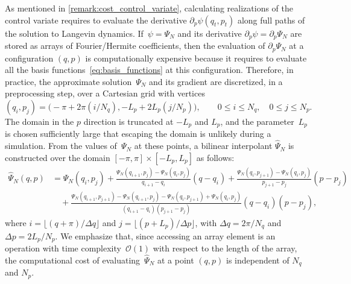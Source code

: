 \documentclass[11pt,a4paper]{article}
\begin{document}
As mentioned in \cref{remark:cost_control_variate},
calculating realizations of the control variate requires to evaluate the derivative $\partial_p \psi(q_t, p_t)$ along full paths of the solution to Langevin dynamics.
If~$\psi = \Psi_N$ and its derivative $\partial_p \psi = \partial_p \Psi_N$ are stored as arrays of Fourier/Hermite coefficients,
then the evaluation of $\partial_p \Psi_N$ at a configuration $(q, p)$ is computationally expensive
because it requires to evaluate all the basis functions~\eqref{eq:basis_functions} at this configuration.
Therefore, in practice, the approximate solution~$\Psi_N$ and its gradient are discretized, in a preprocessing step,
over a Cartesian grid with vertices
\[
    (q_i, p_j) = \bigl(- \pi + 2\pi(i/N_q) , - L_p + 2L_p (j/N_p) \bigr), \qquad 0 \leq i \leq N_q, \quad 0 \leq j \leq N_p.
\]
The domain in the $p$ direction is truncated at $-L_p$ and $L_p$,
and the parameter~$L_p$ is chosen sufficiently large that escaping the domain is unlikely during a simulation.
From the values of~$\Psi_N$ at these points,
a bilinear interpolant $\widehat \Psi_N$ is constructed over the domain $[-\pi, \pi] \times [-L_p, L_p]$ as follows:
\begin{align*}
    \widehat \Psi_N(q, p)
    &= \Psi_N(q_i,p_j) + \frac{\Psi_N(q_{i+1}, p_j) - \Psi_N(q_i, p_j)}{q_{i+1} - q_i} (q - q_i)
    +\frac{\Psi_N(q_{i}, p_{j+1}) - \Psi_N(q_{i}, p_{j})}{p_{j+1} - p_j} (p - p_j) \\
    &\quad + \frac{\Psi_N(q_{i+1}, p_{j+1}) - \Psi_N(q_{i+1}, p_{j}) - \Psi_N(q_{i}, p_{j+1}) + \Psi_N(q_{i}, p_{j})}{(q_{i+1} - q_i)(p_{j+1} - p_j)}  (q-q_i)(p-p_j),
\end{align*}
where $i = \lfloor (q + \pi) / \Delta q \rfloor$ and $j = \lfloor (p+L_p) / \Delta p \rfloor$,
with $\Delta q = 2\pi/N_q$ and $\Delta p = 2L_p/N_p$.
We emphasize that,
since accessing an array element is an operation with time complexity~$\mathcal O(1)$ with respect to the length of the array,
the computational cost of evaluating~$\widehat \Psi_N$ at a point $(q,p)$ is independent of $N_q$ and $N_p$.
\end{document}
